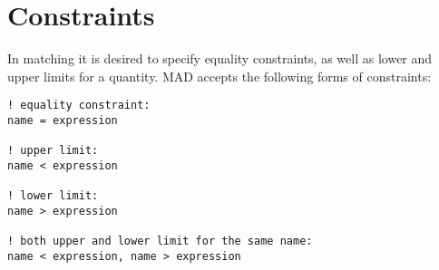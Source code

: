 
\section{Constraints}
\label{sec:constraints}

In matching it is desired to specify equality constraints, as well as
lower and upper limits for a quantity. MAD accepts the following forms
of constraints:  
\begin{verbatim}
! equality constraint:
name = expression

! upper limit:
name < expression

! lower limit:
name > expression

! both upper and lower limit for the same name:
name < expression, name > expression
\end{verbatim}



